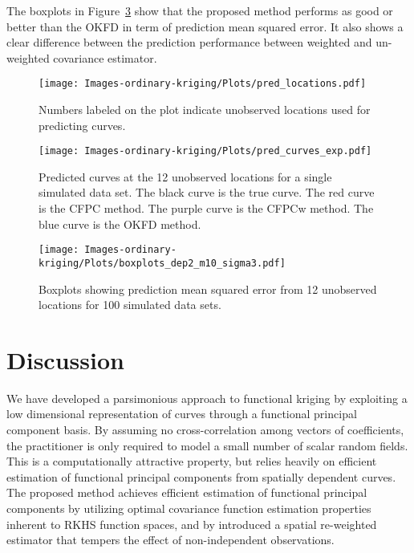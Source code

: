 The boxplots in Figure~\ref{fig:boxplots pred mse} show that the proposed method performs as good or better than the OKFD in term of prediction mean squared error. It also shows a clear difference between the prediction performance between weighted and un-weighted covariance estimator. 
 

\begin{figure}
	\begin{center}
		\texttt{[image: Images-ordinary-kriging/Plots/pred\_locations.pdf]} 
	\end{center}
	\caption{Numbers labeled on the plot indicate unobserved locations used for predicting curves.} \label{fig:pred locations} 
\end{figure}
\begin{figure}
	\begin{center}
		\texttt{[image: Images-ordinary-kriging/Plots/pred\_curves\_exp.pdf]} 
	\end{center}
	\caption{Predicted curves at the 12 unobserved locations for a single simulated data set. The black curve is the true curve. The red curve is the CFPC method. The purple curve is the CFPCw method. The blue curve is the OKFD method. } \label{fig:curve kriging predictions} 
\end{figure}
\begin{figure}
	\begin{center}
		\texttt{[image: Images-ordinary-kriging/Plots/boxplots\_dep2\_m10\_sigma3.pdf]} 
	\end{center}
	\caption{Boxplots showing prediction mean squared error from 12 unobserved locations for 100 simulated data sets. } \label{fig:boxplots pred mse} 
\end{figure}

\section{Discussion} %
\label{sec:discussion}
 We have developed a parsimonious approach to functional kriging by exploiting a low dimensional representation of curves through a functional principal component basis. By assuming no cross-correlation among vectors of coefficients, the practitioner is only required to model a small number of scalar random fields. This is a computationally attractive property, but relies heavily on efficient estimation of functional principal components from spatially dependent curves.  The proposed method achieves efficient estimation of functional principal components by utilizing optimal covariance function estimation properties inherent to RKHS function spaces, and by introduced a spatial re-weighted estimator that tempers the effect of non-independent observations. 
 
